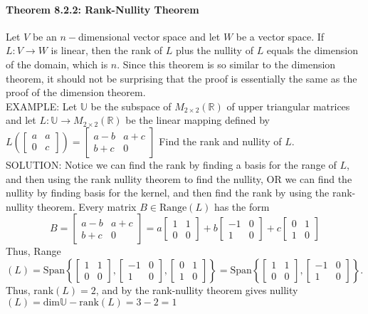 \documentclass[10pt,letter]{article}
\begin{document}
\paragraph{Theorem 8.2.2: Rank-Nullity Theorem} Let $V$ be an $n-$dimensional vector space and let $W$ be a vector space. If $L:V\rightarrow W$ is linear, then the rank of $L$ plus the nullity of $L$ equals the dimension of the domain, which is $n$. Since this theorem is so similar to the dimension theorem, it should not be surprising that the proof is essentially the same as the proof of the dimension theorem. \\ 
EXAMPLE: Let $\mathbb{U}$ be the subspace of $M_{2\times2}(\mathbb{R})$ of upper triangular matrices and let $L:\mathbb{U}\rightarrow M_{2\times2}(\mathbb{R})$ be the linear mapping defined by $L\left(\begin{bmatrix}a&a\\0&c\end{bmatrix}\right)=\begin{bmatrix}a-b&a+c\\b+c&0\end{bmatrix}$ Find the rank and nullity of $L$. \\ 
SOLUTION: Notice we can find the rank by finding a basis for the range of $L$, and then using the rank nullity theorem to find the nullity, OR we can find the nullity by finding basis for the kernel, and then find the rank by using the rank-nullity theorem. Every matrix $B\in\text{Range}(L)$ has the form $$B=\begin{bmatrix}a-b&a+c\\b+c&0\end{bmatrix}=a\begin{bmatrix}1&1\\0&0\end{bmatrix}+b\begin{bmatrix}-1&0\\1&0\end{bmatrix}+c\begin{bmatrix}0&1\\1&0\end{bmatrix}$$ Thus, Range$(L)=\text{Span}\left\{\begin{bmatrix}1&1\\0&0\end{bmatrix},\begin{bmatrix}-1&0\\1&0\end{bmatrix},\begin{bmatrix}0&1\\1&0\end{bmatrix}\right\}=\text{Span}\left\{\begin{bmatrix}1&1\\0&0\end{bmatrix},\begin{bmatrix}-1&0\\1&0\end{bmatrix}\right\}$. Thus, rank$(L)=2$, and by the rank-nullity theorem gives nullity$(L)=\text{dim}\mathbb{U}-\text{rank}(L)=3-2=1$
\end{document}

